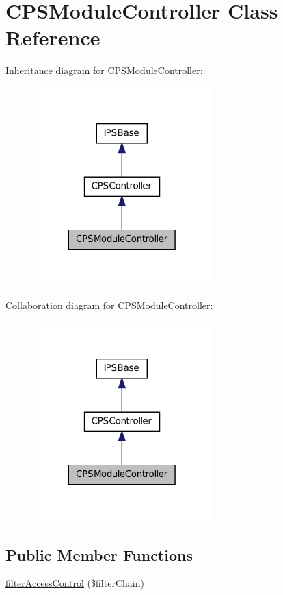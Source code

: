 \hypertarget{classCPSModuleController}{
\section{CPSModuleController Class Reference}
\label{classCPSModuleController}
}


Inheritance diagram for CPSModuleController:\nopagebreak
\begin{figure}[H]
\begin{center}
\leavevmode
\includegraphics[width=196pt]{classCPSModuleController__inherit__graph}
\end{center}
\end{figure}


Collaboration diagram for CPSModuleController:\nopagebreak
\begin{figure}[H]
\begin{center}
\leavevmode
\includegraphics[width=196pt]{classCPSModuleController__coll__graph}
\end{center}
\end{figure}
\subsection*{Public Member Functions}
\begin{DoxyCompactItemize}
\item 
\hyperlink{classCPSModuleController_a6dd745751fad17eb8121cfe741fec50d}{filterAccessControl} (\$filterChain)
\end{DoxyCompactItemize}


